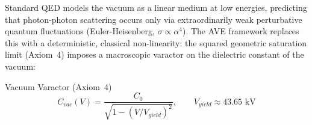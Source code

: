 Standard QED models the vacuum as a linear medium at low energies, predicting that photon-photon scattering occurs only via extraordinarily weak perturbative quantum fluctuations (Euler-Heisenberg, $\sigma \propto \alpha^4$). The AVE framework replaces this with a deterministic, classical non-linearity: the squared geometric saturation limit (Axiom~4) imposes a macroscopic varactor on the dielectric constant of the vacuum:
\begin{resultbox}{Vacuum Varactor (Axiom~4)}
\begin{equation}
    C_{vac}(V) = \frac{C_0}{\sqrt{1 - (V/V_{yield})^2}}, \qquad V_{yield} \approx 43.65 \text{ kV}
    \label{eq:varactor_imd}
\end{equation}
\end{resultbox}

